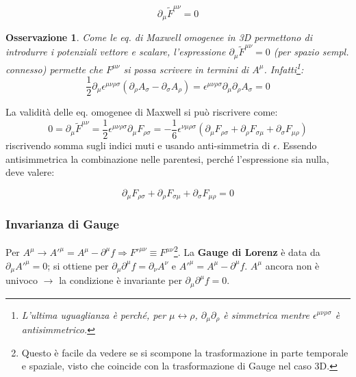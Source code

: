 \documentclass[10pt, a4paper]{scrartcl}
\numberwithin{equation}{subsection}
\theoremstyle{style1}
\newtheorem{osservazione}{Osservazione}[section]
\newenvironment{boxenv}[1][]{
    \begin{eqbox}[#1]
    }{
   \end{eqbox}
}
\begin{document}
\begin{boxenv}[]
\begin{equation}
	\partial _\mu \widetilde{F}^{\mu \nu}  = 0
\end{equation}
\end{boxenv}
\begin{osservazione}
	Come le eq. di Maxwell omogenee in 3D permettono di introdurre i potenziali vettore e scalare, l'espressione $\partial _\mu \widetilde{F}^{\mu \nu}=0 $ (per spazio sempl. connesso) permette che $F^{\mu \nu} $ si possa scrivere in termini di $A^\mu $. Infatti\footnote{L'ultima uguaglianza \`e perch\'e, per $\mu \leftrightarrow \rho $, $\partial _\mu  \partial _\rho $ \`e simmetrica mentre $\epsilon ^{\mu \nu \rho \sigma } $ \`e antisimmetrico.}:
\begin{equation}
	\frac{1}{2}\partial _\mu  \epsilon ^{\mu  \nu \rho  \sigma } (\partial _\rho A_\sigma  - \partial _\sigma A_\rho )	= \epsilon ^{\mu \nu \rho  \sigma } \partial _\mu  \partial _\rho A_\sigma =0
\end{equation}
\end{osservazione}
\noindent La validit\`a delle eq. omogenee di Maxwell si pu\`o riscrivere come:
\begin{equation}
	0 = \partial _\mu  \widetilde{F}^{\mu \nu} = \frac{1}{2} \epsilon ^{\mu \nu \rho \sigma } \partial _\mu  F_{\rho \sigma } = - \frac{1}{6} \epsilon ^{\nu \mu  \rho  \sigma } (\partial _\mu F_{\rho \sigma } + \partial _\rho F_{\sigma \mu } + \partial _\sigma F_{\mu \rho } )
\end{equation}
riscrivendo somma sugli indici muti e usando anti-simmetria di $\epsilon $. Essendo antisimmetrica la combinazione nelle parentesi, perch\'e l'espressione sia nulla, deve valere:
\begin{boxenv}[]
\begin{equation}
	\partial _\mu F_{\rho  \sigma } + \partial _\rho F_{\sigma \mu } + \partial _\sigma F_{\mu \rho } =0
\end{equation}
\end{boxenv}
\subsubsection{Invarianza di Gauge}
Per $A^\mu  \to A'^\mu  = A^\mu  - \partial ^\mu f \Rightarrow F'^{\mu \nu} \equiv F^{\mu \nu} $\footnote{Questo \`e facile da vedere se si scompone la trasformazione in parte temporale e spaziale, visto che coincide con la trasformazione di Gauge nel caso 3D.}. La \textbf{Gauge di Lorenz} \`e data da $\partial _\mu A'^\mu =0$; si ottiene per $\partial _\mu  \partial ^\mu  f = \partial _\nu A^\nu$ e $A'^\mu  = A^\mu - \partial ^\mu  f$. $A^\mu $ ancora non \`e univoco $\to$ la condizione \`e invariante per $\partial _\mu  \partial ^\mu  f = 0$.
\end{document}
